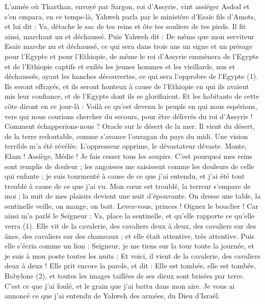 \begin{multicols}{2}
\VerseOne{}L'année où Tharthan, envoyé par Sargon, roi d'Assyrie, vint assiéger Asdod et s’en empara,
en ce temps-là, Yahweh parla par le ministère d'Esaïe fils d'Amots, et lui dit : Va, détache le sac de tes reins et ôte tes souliers de tes pieds. Il fit ainsi, marchant nu et déchaussé.
Puis Yahweh dit : De même que mon serviteur Esaïe marche nu et déchaussé, ce qui sera dans trois ans un signe et un présage pour l'Egypte et pour l’Ethiopie,
de même le roi d'Assyrie emmènera de l’Egypte et de l’Ethiopie captifs et exilés les jeunes hommes et les vieillards, nus et déchaussés, ayant les hanches découvertes, ce qui sera l'opprobre de l'Egypte (1).
Ils seront effrayés, et ils seront honteux à cause de l’Ethiopie en qui ils avaient mis leur confiance, et de l'Egypte dont ils se glorifiaient.
Et les habitants de cette côte diront en ce jour-là : Voilà ce qu’est devenu le peuple en qui nous espérions, vers qui nous courions chercher du secours, pour être délivrés du roi d’Assyrie ! Comment échapperions-nous ?
\VerseOne{}Oracle sur le désert de la mer. Il vient du désert, de la terre redoutable, comme s’avance l’ouragan du pays du midi.
Une vision terrible m'a été révélée. L’oppresseur opprime, le dévastateur dévaste. Monte, Elam ! Assiège, Médie ! Je fais cesser tous les soupirs.
C'est pourquoi mes reins sont remplis de douleur ; les angoisses me saisissent comme les douleurs de celle qui enfante ; je suis tourmenté à cause de ce que j'ai entendu, et j'ai été tout troublé à cause de ce que j'ai vu.
Mon cœur est troublé, la terreur s’empare de moi ; la nuit de mes plaisirs devient une nuit d’épouvante.
On dresse une table, la sentinelle veille, on mange, on boit. Levez-vous, princes ! Oignez le bouclier !
Car ainsi m’a parlé le Seigneur : Va, place la sentinelle, et qu'elle rapporte ce qu'elle verra (1).
Elle vit de la cavalerie, des cavaliers deux à deux, des cavaliers sur des ânes, des cavaliers sur des chameaux ; et elle était attentive, très attentive.
Puis elle s’écria comme un lion : Seigneur, je me tiens sur la tour toute la journée, et je suis à mon poste toutes les nuits ;
Et voici, il vient de la cavalerie, des cavaliers deux à deux ! Elle prit encore la parole, et dit : Elle est tombée, elle est tombée, Babylone (2), et toutes les images taillées de ses dieux sont brisées par terre.
C'est ce que j'ai foulé, et le grain que j'ai battu dans mon aire. Je vous ai annoncé ce que j'ai entendu de Yahweh des armées, du Dieu d'Israël.

\end{multicols}
